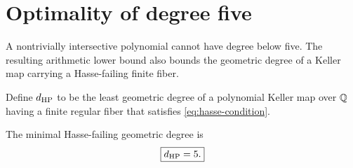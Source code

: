 \section{Optimality of degree five}\label{sec:minimality}

A nontrivially intersective polynomial cannot have degree below five.
The resulting arithmetic lower bound also bounds the geometric degree of
a Keller map carrying a Hasse-failing finite fiber.

Define \(d_{\mathrm{HP}}\) to be the least geometric degree of a polynomial Keller
map over \(\mathbb Q\) having a finite regular fiber that satisfies
\eqref{eq:hasse-condition}.

\begin{theorem}\label{thm:minimality}
The minimal Hasse-failing geometric degree is
\begin{equation}
 \boxed{d_{\mathrm{HP}}=5.}
\end{equation}
\end{theorem}

